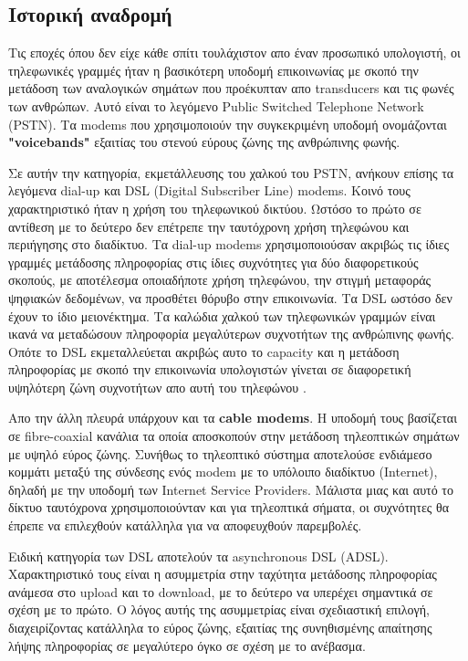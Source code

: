\documentclass[hidelinks, 12pt, a4paper]{article}
\begin{document}
\subsection{Ιστορική αναδρομή}
Τις εποχές όπου δεν είχε κάθε σπίτι τουλάχιστον απο έναν προσωπικό υπολογιστή, οι τηλεφωνικές γραμμές ήταν η βασικότερη υποδομή επικοινωνίας με σκοπό την μετάδοση των αναλογικών σημάτων που προέκυπταν απο transducers και τις φωνές των ανθρώπων. Αυτό είναι το λεγόμενο Public Switched Telephone Network (PSTN). Τα modems που χρησιμοποιούν την συγκεκριμένη υποδομή ονομάζονται \textbf{"voicebands"} εξαιτίας του στενού εύρους ζώνης της ανθρώπινης φωνής. 

Σε αυτήν την κατηγορία, εκμετάλλευσης του χαλκού του PSTN, ανήκουν επίσης τα λεγόμενα dial-up και DSL (Digital Subscriber Line) modems. Κοινό τους χαρακτηριστικό ήταν η χρήση του τηλεφωνικού δικτύου. Ωστόσο το πρώτο σε αντίθεση με το δεύτερο δεν επέτρεπε την ταυτόχρονη χρήση τηλεφώνου και περιήγησης στο διαδίκτυο. Τα dial-up modems χρησιμοποιούσαν ακριβώς τις ίδιες γραμμές μετάδοσης πληροφορίας στις ίδιες συχνότητες για δύο διαφορετικούς σκοπούς, με αποτέλεσμα οποιαδήποτε χρήση τηλεφώνου, την στιγμή μεταφοράς ψηφιακών δεδομένων, να προσθέτει θόρυβο στην επικοινωνία. Τα DSL ωστόσο δεν έχουν το ίδιο μειονέκτημα. Τα καλώδια χαλκού των τηλεφωνικών γραμμών είναι ικανά να μεταδώσουν πληροφορία μεγαλύτερων συχνοτήτων της ανθρώπινης φωνής. Οπότε το DSL εκμεταλλεύεται ακριβώς αυτο το capacity και η μετάδοση πληροφορίας με σκοπό την επικοινωνία υπολογιστών γίνεται σε διαφορετική υψηλότερη ζώνη συχνοτήτων απο αυτή του τηλεφώνου \cite{modemBritanica}.

Απο την άλλη πλευρά υπάρχουν και τα \textbf{cable modems}. Η υποδομή τους βασίζεται σε fibre-coaxial κανάλια τα οποία αποσκοπούν στην μετάδοση τηλεοπτικών σημάτων με υψηλό εύρος ζώνης. Συνήθως το τηλεοπτικό σύστημα αποτελούσε ενδιάμεσο κομμάτι μεταξύ της σύνδεσης ενός modem με το υπόλοιπο διαδίκτυο (Internet), δηλαδή με την υποδομή των Internet Service Providers. Μάλιστα μιας και αυτό το δίκτυο ταυτόχρονα χρησιμοποιούνταν και για τηλεοπτικά σήματα, οι συχνότητες θα έπρεπε να επιλεχθούν κατάλληλα για να αποφευχθούν παρεμβολές.  

Ειδική κατηγορία των DSL αποτελούν τα asynchronous DSL (ADSL). Χαρακτηριστικό τους είναι η ασυμμετρία στην ταχύτητα μετάδοσης πληροφορίας ανάμεσα στο upload και το download, με το δεύτερο να υπερέχει σημαντικά σε σχέση με το πρώτο. Ο λόγος αυτής της ασυμμετρίας είναι σχεδιαστική επιλογή, διαχειρίζοντας κατάλληλα το εύρος ζώνης, εξαιτίας της συνηθισμένης απαίτησης λήψης πληροφορίας σε μεγαλύτερο όγκο σε σχέση με το ανέβασμα. 
\end{document}

